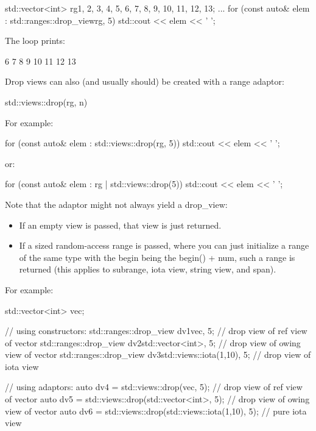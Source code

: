 \begin{cpp}
std::vector<int> rg{1, 2, 3, 4, 5, 6, 7, 8, 9, 10, 11, 12, 13};
...
for (const auto& elem : std::ranges::drop_view{rg, 5}) {
	std::cout << elem << ' ';
}
\end{cpp}

The loop prints:

\begin{shell}
6 7 8 9 10 11 12 13
\end{shell}


Drop views can also (and usually should) be created with a range adaptor:

\begin{cpp}
std::views::drop(rg, n)
\end{cpp}

For example:

\begin{cpp}
for (const auto& elem : std::views::drop(rg, 5)) {
	std::cout << elem << ' ';
}
\end{cpp}

or:

\begin{cpp}
for (const auto& elem : rg | std::views::drop(5)) {
	std::cout << elem << ' ';
}
\end{cpp}

Note that the adaptor might not always yield a drop\_view:

\begin{itemize}
\item
If an empty view is passed, that view is just returned.

\item
If a sized random-access range is passed, where you can just initialize a range of the same type with the begin being the begin() + num, such a range is returned (this applies to subrange, iota view, string view, and span).
\end{itemize}

For example:

\begin{cpp}
std::vector<int> vec;

// using constructors:
std::ranges::drop_view dv1{vec, 5}; // drop view of ref view of vector
std::ranges::drop_view dv2{std::vector<int>{}, 5}; // drop view of owing view of vector
std::ranges::drop_view dv3{std::views::iota(1,10), 5}; // drop view of iota view

// using adaptors:
auto dv4 = std::views::drop(vec, 5); // drop view of ref view of vector
auto dv5 = std::views::drop(std::vector<int>{}, 5); // drop view of owing view of vector
auto dv6 = std::views::drop(std::views::iota(1,10), 5); // pure iota view
\end{cpp}

